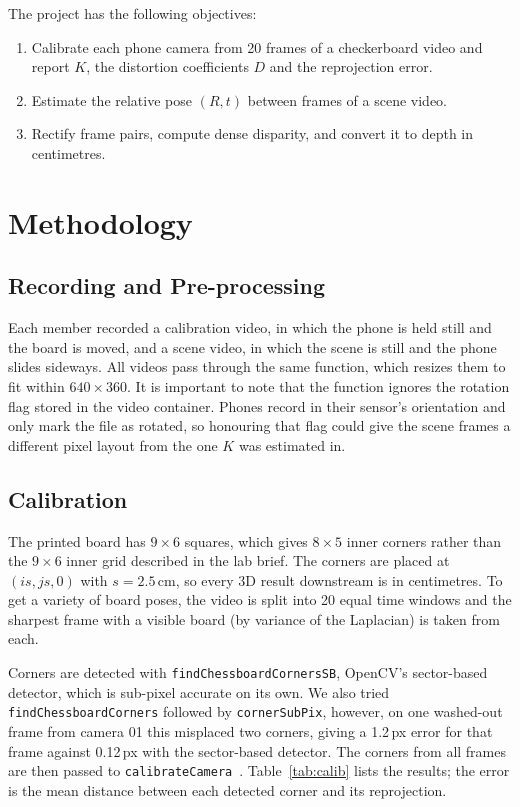 \documentclass[conference]{assets/latex/IEEEtran}
\begin{document}
The project has the following objectives:
\begin{enumerate}
\item Calibrate each phone camera from 20 frames of a checkerboard video and report $K$, the distortion coefficients $D$ and the reprojection error.
\item Estimate the relative pose $(R, t)$ between frames of a scene video.
\item Rectify frame pairs, compute dense disparity, and convert it to depth in centimetres.
\end{enumerate}

\section{Methodology}

\subsection{Recording and Pre-processing}
Each member recorded a calibration video, in which the phone is held still and the board is moved, and a scene video, in which the scene is still and the phone slides sideways. All videos pass through the same function, which resizes them to fit within $640\times360$. It is important to note that the function ignores the rotation flag stored in the video container. Phones record in their sensor's orientation and only mark the file as rotated, so honouring that flag could give the scene frames a different pixel layout from the one $K$ was estimated in.

\subsection{Calibration}
The printed board has $9\times6$ squares, which gives $8\times5$ inner corners rather than the $9\times6$ inner grid described in the lab brief. The corners are placed at $(i s, j s, 0)$ with $s = 2.5$\,cm, so every 3D result downstream is in centimetres. To get a variety of board poses, the video is split into 20 equal time windows and the sharpest frame with a visible board (by variance of the Laplacian) is taken from each.

Corners are detected with \texttt{findChessboardCornersSB}, OpenCV's sector-based detector, which is sub-pixel accurate on its own. We also tried \texttt{findChessboardCorners} followed by \texttt{cornerSubPix}, however, on one washed-out frame from camera 01 this misplaced two corners, giving a 1.2\,px error for that frame against 0.12\,px with the sector-based detector. The corners from all frames are then passed to \texttt{calibrateCamera}~\cite{zhang2000}. Table~\ref{tab:calib} lists the results; the error is the mean distance between each detected corner and its reprojection.
\end{document}
